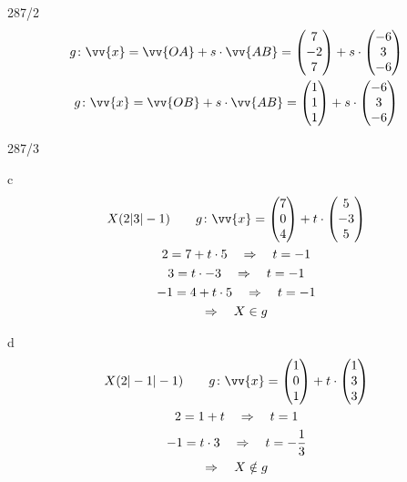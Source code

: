 \begin{exercise}{287/2}
\begin{gather*}
    g \colon \vv{x} = \vv{OA} + s \cdot \vv{AB} = \begin{pmatrix}7 \\ -2 \\ 7\end{pmatrix} + s \cdot \begin{pmatrix}-6 \\ 3 \\ -6\end{pmatrix} \\
    g \colon \vv{x} = \vv{OB} + s \cdot \vv{AB} = \begin{pmatrix}1 \\ 1 \\ 1\end{pmatrix} + s \cdot \begin{pmatrix}-6 \\ 3 \\ -6\end{pmatrix}
  \end{gather*}
\end{exercise}
\begin{exercise}{287/3}
  \item [c]
  \begin{gather*}
    X(2|3|-1) \qquad g \colon \vv{x} = \begin{pmatrix}7 \\ 0 \\ 4\end{pmatrix} + t \cdot \begin{pmatrix}5 \\ -3 \\ 5\end{pmatrix} \\
    2 = 7 + t \cdot 5 \quad\Rightarrow\quad t = -1 \\
    3 = t \cdot -3 \quad\Rightarrow\quad t = -1 \\
    -1 = 4 + t \cdot 5 \quad\Rightarrow\quad t = -1 \\
    \Rightarrow\quad X \in g
  \end{gather*}
  \item [d]
  \begin{gather*}
    X(2|-1|-1) \qquad g \colon \vv{x} = \begin{pmatrix}1 \\ 0 \\ 1\end{pmatrix} + t \cdot \begin{pmatrix}1 \\ 3 \\ 3\end{pmatrix} \\
    2 = 1 + t \quad\Rightarrow\quad t = 1 \\
    -1 = t \cdot 3 \quad\Rightarrow\quad t = -\frac{1}{3} \\
    \Rightarrow\quad X \notin g
  \end{gather*}
\end{exercise}
